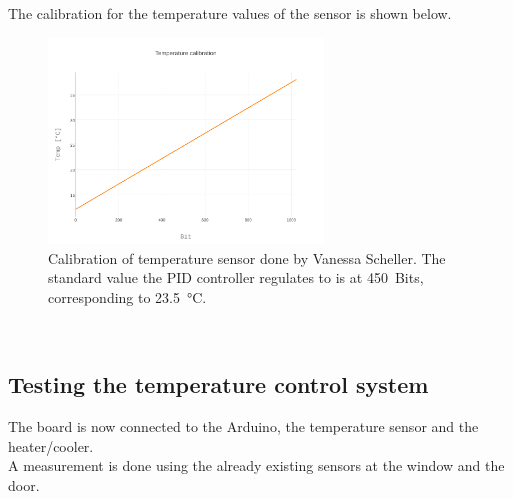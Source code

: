 \documentclass[12pt]{scrartcl}
\begin{document}
      \noindent The calibration for the temperature values of the sensor is shown
      below.
      \begin{figure}[h]
        \centering
        \includegraphics[width = 0.65\textwidth]{./plots/plot_image(4)}
        \caption{Calibration of temperature sensor done by Vanessa Scheller.
        The standard value the PID controller regulates to is at 450~Bits,
        corresponding to 23.5~°C.}
        \label{fig10}
      \end{figure}
      \\
    \subsection{Testing the temperature control system}
      The board is now connected to the Arduino, the temperature sensor and the
      heater/cooler. \\
      A measurement is done using the already existing sensors at the window and
      the door.
\end{document}
